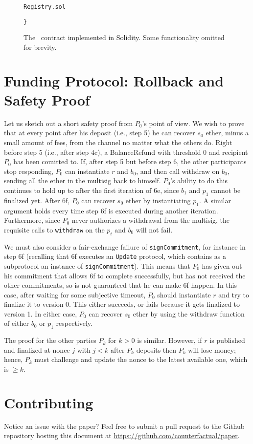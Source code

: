 \documentclass[prb,floatfix,reprint,nofootinbib,amsmath,amssymb,epsfig,pre,floats,letterpaper,groupedaffiliation,tightenlines,allcolors=blue,11pt]{revtex4}
\theoremstyle{definition}
\theoremstyle{definition}
\theoremstyle{definition}
\begin{document}
\begin{appendix}
\begin{figure}[H]
\begin{soliditysnippet}{\texttt{Registry.sol}}
\begin{lstlisting}[language=Solidity]
}
      \end{lstlisting}
      \end{soliditysnippet}
      \caption{The \registry\ contract implemented in Solidity. Some functionality omitted for brevity.}
      \label{figure:reification}
      \end{figure}

\newpage
\section{Funding Protocol: Rollback and Safety Proof}
\label{sec:safetyproof}

Let us sketch out a short safety proof from $P_0$'s point of view. We wish to prove that at every point after his deposit (i.e., step 5) he can recover $s_0$ ether, minus a small amount of fees, from the channel no matter what the others do. Right before step 5 (i.e., after step 4c), a BalanceRefund with threshold 0 and recipient $P_0$ has been comitted to. If, after step 5 but before step 6, the other participants stop responding, $P_0$ can instantiate $r$ and $b_0$, and then call withdraw on $b_0$, sending all the ether in the multisig back to himself. $P_0$'s ability to do this continues to hold up to after the first iteration of 6e, since $b_1$ and $p_1$ cannot be finalized yet. After 6f, $P_0$ can recover $s_0$ ether by instantiating $p_1$. A similar argument holds every time step 6f is executed during another iteration. Furthermore, since $P_0$ never authorizes a withdrawal from the multisig, the requisite calls to \texttt{withdraw} on the $p_i$ and $b_0$ will not fail.

We must also consider a fair-exchange failure of \texttt{signCommitment}, for instance in step 6f (recalling that 6f executes an \texttt{Update} protocol, which contains as a subprotocol an instance of \texttt{signCommitment}). This means that $P_0$ has given out his commitment that allows 6f to complete successfully, but has not received the other commitments, so is not guaranteed that he can make 6f happen. In this case, after waiting for some subjective timeout, $P_0$ should instantiate $r$ and try to finalize it to version 0. This either succeeds, or fails because it gets finalized to version 1. In either case, $P_0$ can recover $s_0$ ether by using the withdraw function of either $b_0$ or $p_1$ respectively.

The proof for the other parties $P_k$ for $k > 0$ is similar. However, if $r$ is published and finalized at nonce $j$ with $j  < k$ after $P_k$ deposits then $P_k$ will lose money; hence, $P_k$ must challenge and update the nonce to the latest available one, which is $\ge k$.

\end{appendix}

\section{Contributing}
Notice an issue with the paper? Feel free to submit a pull request to the Github repository hosting this document at \url{https://github.com/counterfactual/paper}.
\end{document}
